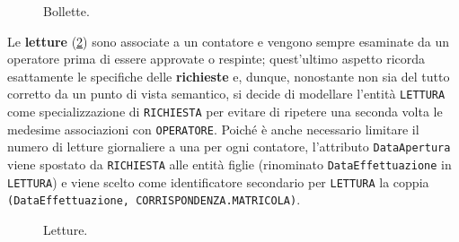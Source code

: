 \documentclass[a4paper,12pt]{report}
\begin{document}
\begin{figure}[H]
\centering{}
\caption{Bollette.}
\label{fig:reports}
\end{figure}


Le \textbf{letture} (\cref{fig:measurements}) sono associate a un contatore e vengono sempre esaminate da un operatore prima di essere approvate o respinte; quest'ultimo aspetto ricorda esattamente le specifiche delle \textbf{richieste} e, dunque, nonostante non sia del tutto corretto da un punto di vista semantico, si decide di modellare l'entità \texttt{LETTURA} come specializzazione di \texttt{RICHIESTA} per evitare di ripetere una seconda volta le medesime associazioni con \texttt{OPERATORE}. Poiché è anche necessario limitare il numero di letture giornaliere a una per ogni contatore, l'attributo \texttt{DataApertura} viene spostato da \texttt{RICHIESTA} alle entità figlie (rinominato \texttt{DataEffettuazione} in \texttt{LETTURA}) e viene scelto come identificatore secondario per \texttt{LETTURA} la coppia \texttt{(DataEffettuazione, CORRISPONDENZA.MATRICOLA)}.

\begin{figure}[H]
\centering{}
\caption{Letture.}
\label{fig:measurements}
\end{figure}
\end{document}
